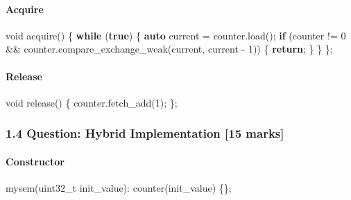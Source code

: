 \documentclass[
]{article}
\newenvironment{Shaded}{}{}
\newcommand{\ControlFlowTok}[1]{\textcolor[rgb]{0.00,0.44,0.13}{\textbf{#1}}}
\newcommand{\DataTypeTok}[1]{\textcolor[rgb]{0.56,0.13,0.00}{#1}}
\newcommand{\DecValTok}[1]{\textcolor[rgb]{0.25,0.63,0.44}{#1}}
\newcommand{\KeywordTok}[1]{\textcolor[rgb]{0.00,0.44,0.13}{\textbf{#1}}}
\newcommand{\NormalTok}[1]{#1}
\newcommand{\OperatorTok}[1]{\textcolor[rgb]{0.40,0.40,0.40}{#1}}
\begin{document}
\paragraph{Acquire}\label{acquire}

\begin{Shaded}
\begin{Highlighting}[]
\DataTypeTok{void}\NormalTok{ acquire}\OperatorTok{()} \OperatorTok{\{}
  \ControlFlowTok{while} \OperatorTok{(}\KeywordTok{true}\OperatorTok{)} \OperatorTok{\{}
    \KeywordTok{auto}\NormalTok{ current }\OperatorTok{=}\NormalTok{ counter}\OperatorTok{.}\NormalTok{load}\OperatorTok{();}
    \ControlFlowTok{if} \OperatorTok{(}\NormalTok{counter }\OperatorTok{!=} \DecValTok{0} \OperatorTok{\&\&}\NormalTok{ counter}\OperatorTok{.}\NormalTok{compare\_exchange\_weak}\OperatorTok{(}\NormalTok{current}\OperatorTok{,}\NormalTok{ current }\OperatorTok{{-}} \DecValTok{1}\OperatorTok{))} \OperatorTok{\{}
      \ControlFlowTok{return}\OperatorTok{;}
    \OperatorTok{\}}
  \OperatorTok{\}}
\OperatorTok{\};}
\end{Highlighting}
\end{Shaded}

\paragraph{Release}\label{release}

\begin{Shaded}
\begin{Highlighting}[]
\DataTypeTok{void}\NormalTok{ release}\OperatorTok{()} \OperatorTok{\{}\NormalTok{ counter}\OperatorTok{.}\NormalTok{fetch\_add}\OperatorTok{(}\DecValTok{1}\OperatorTok{);} \OperatorTok{\};}
\end{Highlighting}
\end{Shaded}

\subsubsection{1.4 Question: Hybrid Implementation {[}15
marks{]}}\label{question-hybrid-implementation-15-marks}

\paragraph{Constructor}\label{constructor-1}

\begin{Shaded}
\begin{Highlighting}[]
\NormalTok{mysem}\OperatorTok{(}\DataTypeTok{uint32\_t}\NormalTok{ init\_value}\OperatorTok{):}\NormalTok{ counter}\OperatorTok{(}\NormalTok{init\_value}\OperatorTok{)} \OperatorTok{\{\};}
\end{Highlighting}
\end{Shaded}
\end{document}
